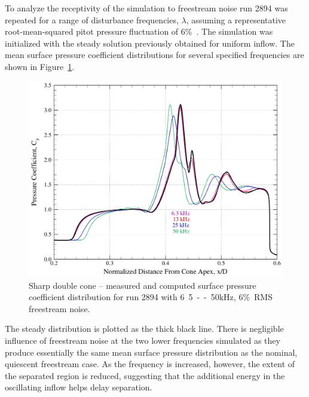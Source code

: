 To analyze the receptivity of the simulation to freestream noise run 2894 was repeated for a range of disturbance frequencies, $\lambda$, assuming a representative root-mean-squared pitot pressure fluctuation of 6\%~\cite{lafferty_norris_AEDC_noise}. The simulation was initialized with the steady solution previously obtained for uniform inflow.  The mean surface pressure coefficient distributions for several specified frequencies are shown in Figure~\ref{fig:double_cone_AEDC_2894_unsteady_6percent_Cpavg_comp}.
\begin{figure}[hbtp]
  \begin{center}
    \includegraphics[width=.9\textwidth]{figures/aedc_double_cone/2894/Cp_freq_comp}
    \caption{Sharp double cone -- measured and computed surface pressure coefficient distribution for run 2894 with \unit{6.5--50}{kHz}, 6\%~RMS freestream noise.\label{fig:double_cone_AEDC_2894_unsteady_6percent_Cpavg_comp}}
  \end{center}
\end{figure}
The steady distribution is plotted as the thick black line. There is negligible influence of freestream noise at the two lower frequencies simulated as they produce essentially the same mean surface pressure distribution as the nominal, quiescent freestream case.  As the frequency is increased, however, the extent of the separated region is reduced, suggesting that the additional energy in the oscillating inflow helps delay separation.


